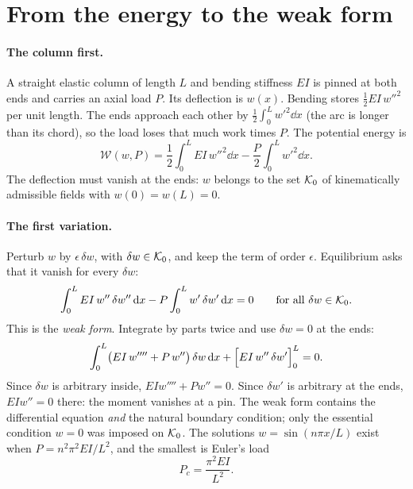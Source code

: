 
\section{From the energy to the weak form}\label{sec:nc-weak}
%

\paragraph{The column first.}
%
A straight elastic column of length $L$ and bending stiffness $EI$ is pinned at both
ends and carries an axial load $P$. Its deflection is $w(x)$. Bending stores
$\tfrac12 EI\,w''^2$ per unit length. The ends approach each other by
$\displaystyle\tfrac12\int_0^L w'^2\dd x$ (the arc is longer than its chord), so the load loses that much
work times $P$. The potential energy is
\begin{equation}\label{eq:nc-column-energy}
  \mathcal{W}(w,P) = \frac12\int_0^L EI\,w''^2\dd x - \frac P2\int_0^L w'^2\dd x .
\end{equation}
The deflection must vanish at the ends: $w$ belongs to the set $\mathcal{K}_0$ of
kinematically admissible fields with $w(0) = w(L) = 0$.

\paragraph{The first variation.}
Perturb $w$ by $\epsilon\,\delta w$, with $\delta w \in \mathcal{K}_0$, and keep the term of order
$\epsilon$. Equilibrium asks that it vanish for every $\delta w$:
\begin{equation}\label{eq:nc-column-weak}
  \int_0^L EI\,w''\,\delta w''\,\mathrm{d} x - P\int_0^L w'\,\delta w'\,\mathrm{d} x = 0
  \qquad \text{for all } \delta w \in \mathcal{K}_0 .
\end{equation}
This is the \emph{weak form}. Integrate by parts twice and use $\delta w = 0$ at the ends:
\begin{equation}\label{eq:nc-column-strong}
  \int_0^L \bigl(EI\,w'''' + P\,w''\bigr)\,\delta w\,\mathrm{d} x
  + \Bigl[EI\,w''\,\delta w'\Bigr]_0^L = 0 .
\end{equation}
Since $\delta w$ is arbitrary inside, $EIw'''' + Pw'' = 0$. Since $\delta w'$ is
arbitrary at the ends, $EIw'' = 0$ there: the moment vanishes at a pin. The weak
form contains the differential equation \emph{and} the natural boundary condition; only
the essential condition $w = 0$ was imposed on $\mathcal{K}_0$. The solutions
$w = \sin(n\pi x/L)$ exist when $P = n^2\pi^2EI/L^2$, and the smallest is Euler's load
\begin{equation}\label{eq:nc-euler}
  P_c = \frac{\pi^2EI}{L^2} .
\end{equation}

